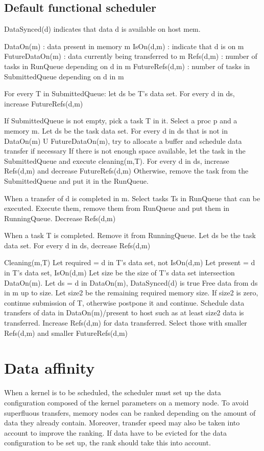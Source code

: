 \subsection{Default functional scheduler}
DataSynced(d) indicates that data d is available on host mem.

DataOn(m) : data present in memory m
IsOn(d,m) : indicate that d is on m
FutureDataOn(m)  : data currently being transferred to m
Refs(d,m) : number of tasks in RunQueue depending on d in m
FutureRefs(d,m) : number of tasks in SubmittedQueue depending on d in m


For every T in SubmittedQueue:
let ds be T's data set.
For every d in ds, increase FutureRefs(d,m)

If SubmittedQueue is not empty, pick a task T in it.
Select a proc p and a memory m.
Let ds be the task data set.
For every d in ds that is not in DataOn(m) U FutureDataOn(m), try to allocate a buffer and schedule data transfer if necessary
If there is not enough space available, let the task in the SubmittedQueue and execute cleaning(m,T).
For every d in ds, increase Refs(d,m) and decrease FutureRefs(d,m)
Otherwise, remove the task from the SubmittedQueue and put it in the RunQueue.

When a transfer of d is completed in m.
Select tasks Ts in RunQueue that can be executed.
Execute them, remove them from RunQueue and put them in RunningQueue.
Decrease Refs(d,m)

When a task T is completed.
Remove it from RunningQueue.
Let ds be the task data set.
For every d in ds, decrease Refs(d,m)

Cleaning(m,T)
Let required = {d in T's data set, not IsOn(d,m)}
Let present = {d in T's data set, IsOn(d,m)}
Let size be the size of T's data set intersection DataOn(m).
Let ds = {d in DataOn(m), DataSynced(d) is true}
Free data from ds in m up to size.
Let size2 be the remaining required memory size.
If size2 is zero, continue submission of T, otherwise postpone it and continue.
Schedule data transfers of data in DataOn(m)/present to host such as at least size2 data is transferred.
Increase Refs(d,m) for data transferred.
Select those with smaller Refs(d,m) and smaller FutureRefs(d,m)


\section{Data affinity}
When a kernel is to be scheduled, the scheduler must set up the data configuration composed of the kernel parameters on a memory node.
To avoid superfluous transfers, memory nodes can be ranked depending on the amount of data they already contain.
Moreover, transfer speed may also be taken into account to improve the ranking.
If data have to be evicted for the data configuration to be set up, the rank should take this into account.


